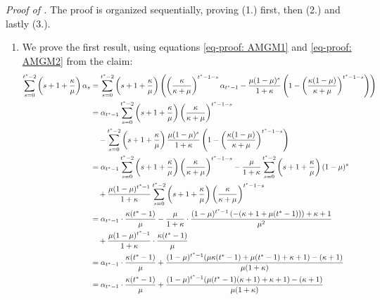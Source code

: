 \emph{Proof of .}
    The proof is organized sequentially, proving (1.) first, then (2.) and lastly (3.).
    \begin{enumerate}
        \item We prove the first result, using  equations \ref{eq-proof: AMGM1} and \ref{eq-proof: AMGM2} from the claim:
    \begin{align*}
        \sum_{s=0}^{t^*-2} \left(s+1+\frac{\market}{\prob} \right) \alpha_s &= \sum_{s=0}^{t^*-2} \left(s+1+\frac{\market}{\prob} \right) \left(\left(\frac{\market}{\market+\prob}\right)^{t^* - 1 - s} \alpha_{t^* -1} - \frac{\prob (1-\prob)^{s}}{ 1+ \market} \left( 1 - \left( \frac{\market(1-\prob)}{\market +\prob} \right)^{t^* - 1 - s} \right)\right)\\ 
        &= \alpha_{t^* -1}\sum_{s=0}^{t^*-2} \left(s+1+\frac{\market}{\prob} \right) \left(\frac{\market}{\market+\prob}\right)^{t^* - 1 - s}\\
        &\quad - \sum_{s=0}^{t^*-2} \left(s+1+\frac{\market}{\prob} \right)\frac{\prob (1-\prob)^{s}}{1+\market} \left( 1 - \left( \frac{\market(1-\prob)}{\market+\prob} \right)^{t^* - 1 - s} \right)\\
        &=\alpha_{t^* -1}\sum_{s=0}^{t^*-2} \left(s+1+\frac{\market}{\prob} \right)\left(\frac{\market}{\market+\prob}\right)^{t^* - 1 - s} - \frac{\prob}{1+\market} \sum_{s=0}^{t^*-2} \left(s+1+\frac{\market}{\prob} \right) (1-\prob)^s\\
        & \quad + \frac{\prob (1-\prob)^{t^*-1}}{1+\market} \sum_{s=0}^{t^*-2} \left(s+1+\frac{\market}{\prob} \right) \left(\frac{\market}{\market+\prob}\right)^{t^* - 1 - s}\\
        &= \alpha_{t^*-1} \cdot \frac{\market(t^*-1)}{\prob} - \frac{\prob}{1+\market} \cdot \frac{(1 - \prob)^{t^* - 1} \left( -(\market + 1 + \prob (t^* - 1)) \right) + \market + 1}{\prob^2}\\
        &\quad + \frac{\prob (1-\prob)^{t^*-1}}{1+\market} \cdot \frac{\market(t^*-1)}{\prob}\\
        &= \alpha_{t^*-1} \cdot \frac{\market(t^*-1)}{\prob} + \frac{(1-\prob)^{t^*-1} (\prob \market (t^*-1) + \prob (t^*-1) + \market + 1) - (\market + 1) }{\prob(1+\market)} \\
        &= \alpha_{t^*-1} \cdot \frac{\market(t^*-1)}{\prob} + \frac{(1-\prob)^{t^*-1} (\prob(t^*-1) (\market + 1) + \market + 1) - (\market + 1) }{\prob(1+\market)}\\

\end{align*}
\end{enumerate}
